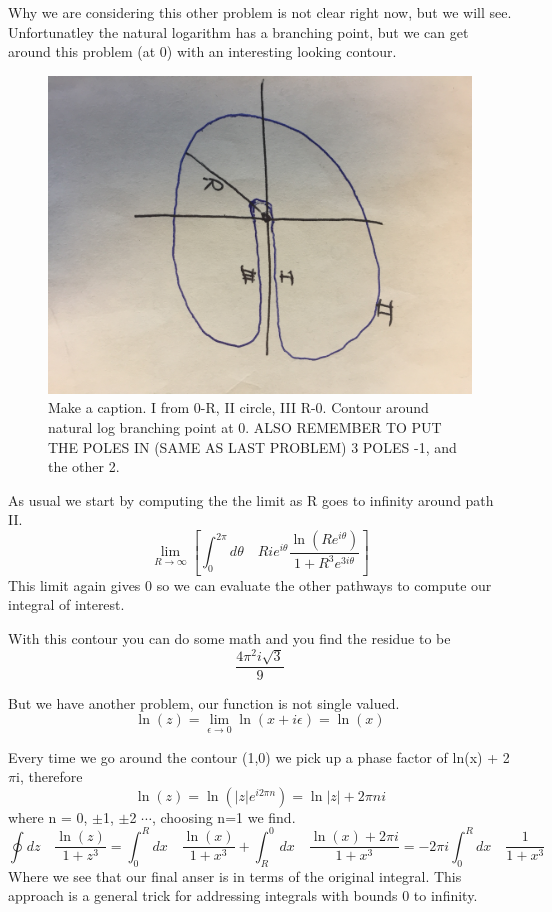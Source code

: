 \documentclass{article}
\newcommand{\be}{\begin{equation}}
\newcommand{\ee}{\end{equation}}
\begin{document}
Why we are considering this other problem is not clear right now, but we will see.
Unfortunatley the natural logarithm has a branching point, but we can get around this problem (at 0) with an interesting looking contour. 
\begin{figure}[H]
  \centering
    \includegraphics[scale=0.2]{Figures/log.png}
    \caption{Make a caption. I from 0-R, II circle, III R-0. Contour around natural log branching point at 0. ALSO REMEMBER TO PUT THE POLES IN (SAME AS LAST PROBLEM) 3 POLES -1, and the other 2. }
\end{figure}

As usual we start by computing the the limit as R goes to infinity around path II. 
\be
\lim_{R \rightarrow \infty}{\left[\int_0^{2\pi} d\theta \quad Rie^{i\theta} \frac{\ln\left(Re^{i\theta}\right)}{1+R^3e^{3i\theta}}\right]}
\ee
This limit again gives 0 so we can evaluate the other pathways to compute our integral of interest. 

With this contour you can do some math and you find the residue to be 
\be
\frac{4\pi^2i\sqrt{3}}{9}
\ee

But we have another problem, our function is not single valued. 
\be
\ln(z) = \lim_{\epsilon\rightarrow 0}{\ln(x+i\epsilon)} = \ln(x)
\ee

Every time we go around the contour (1,0) we pick up a phase factor of ln(x) + 2$\pi$i, therefore
\be
\ln(z) = \ln\left(|z|e^{i2\pi n}\right) = \ln|z| + 2\pi n i
\ee
where n = 0, $\pm$1, $\pm$2 $\cdots$, choosing n=1 we find.
\be
\oint dz \quad \frac{\ln(z)}{1+z^3} = \int_0^R dx \quad \frac{\ln(x)}{1+x^3} + \int_R^0 dx \quad \frac{\ln(x)+2\pi i}{1+x^3} = -2\pi i \int_0^R dx \quad \frac{1}{1+x^3}
\ee
Where we see that our final anser is in terms of the original integral. 
This approach is a general trick for addressing integrals with bounds 0 to infinity. 
\end{document}
